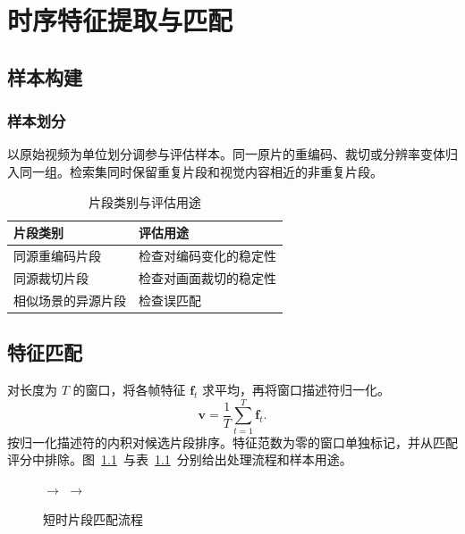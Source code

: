 \chapter{时序特征提取与匹配}
\label{chap:methods}

\section{样本构建}

\subsection{样本划分}

以原始视频为单位划分调参与评估样本。同一原片的重编码、裁切或分辨率变体归入同一组。检索集同时保留重复片段和视觉内容相近的非重复片段。

\begin{table}[htbp]
  \centering
  \caption{片段类别与评估用途}
  \label{tab:groups}
  \begin{tabular}{ll}
    \toprule
    片段类别 & 评估用途 \\
    \midrule
    同源重编码片段 & 检查对编码变化的稳定性 \\
    同源裁切片段 & 检查对画面裁切的稳定性 \\
    相似场景的异源片段 & 检查误匹配 \\
    \bottomrule
  \end{tabular}
\end{table}

\section{特征匹配}

对长度为 \(T\) 的窗口，将各帧特征 \(\mathbf{f}_t\) 求平均，再将窗口描述符归一化。
\begin{equation}
  \mathbf{v} = \frac{1}{T}\sum_{t=1}^{T}\mathbf{f}_t .
  \label{eq:pooling}
\end{equation}
按归一化描述符的内积对候选片段排序。特征范数为零的窗口单独标记，并从匹配评分中排除。图~\ref{fig:workflow}~与表~\ref{tab:groups}~分别给出处理流程和样本用途。

\begin{figure}[htbp]
  \centering
  \enspace\(\longrightarrow\)\enspace
  \enspace\(\longrightarrow\)\enspace
  \caption{短时片段匹配流程}
  \label{fig:workflow}
\end{figure}
